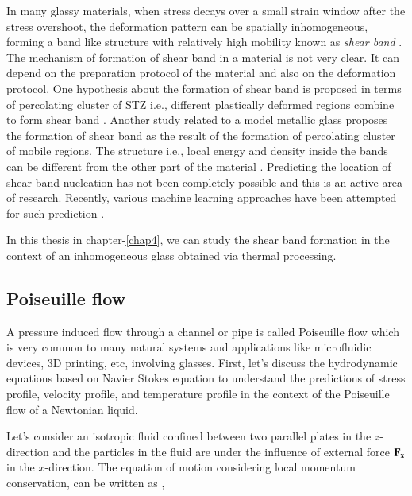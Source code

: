     In many glassy materials,  when stress decays over a small strain window after the stress overshoot, the deformation pattern can be spatially inhomogeneous, forming a band like structure with relatively high mobility known as {\em shear band} \cite{gauravPRE15,golkia2020,anshul17}. The mechanism of formation of shear band in a material is not very clear. It can depend on the preparation protocol of the material \cite{ozawa2018random,ozawa2022rare} and also on the deformation protocol. One hypothesis about the formation of shear band is proposed in terms of percolating cluster of STZ i.e., different plastically deformed regions combine to form shear band \cite{dasgupta2013yield,hassani2019probing}. Another study related to a model metallic glass \cite{gauravPRE15} proposes the formation of shear band as the result of the formation of percolating cluster of mobile regions. The structure i.e., local energy and density inside the bands can be different from the other part of the material \cite{lewandowski2006temperature}. Predicting the location of shear band nucleation has not been completely possible and this is an active area of research. Recently, various machine learning approaches have been attempted for such prediction \cite{fan2022predicting}.
    
    In this thesis in chapter-\ref{chap4}, we can study the shear band formation in the context of an inhomogeneous glass obtained via thermal processing.
    
    \subsection{Poiseuille flow}\label{PoiseuilleFlow}
    A pressure induced flow through a channel or pipe is called Poiseuille flow which is very common to many natural systems and applications like microfluidic devices, 3D printing, etc, involving glasses. First, let's discuss the hydrodynamic equations based on Navier Stokes equation to understand the predictions of stress profile, velocity profile, and temperature profile in the context of the Poiseuille flow of a Newtonian liquid.
    
    Let's consider an isotropic fluid confined between two parallel plates in the $z$-direction and the particles in the fluid are under the influence of external force ${\bf F_x}$ in the $x$-direction. The equation of motion considering local momentum conservation, can be written as \cite{travis1997departure,travis2000},

